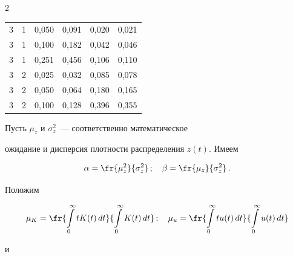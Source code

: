 \begin{multicols}{2}
\begin{table}
\begin{center}
\begin{tabular}{|c|c|c|c|c|c|}
3&1&0,050&0,091&0,020&0,021\\




3&1&0,100&0,182&0,042&0,046\\




3&1&0,251&0,456&0,106&0,110\\




3&2&0,025&0,032&0,085&0,078\\




3&2&0,050&0,064&0,180&0,165\\




3&2&0,100&0,128&0,396&0,355\\


\hline


\end{tabular}


\end{center}


\end{table}





Пусть $\mu_z$ и $\sigma_z^2$~--- соответственно математическое


ожидание и дисперсия плотности распределения $z(t)$. Имеем


$$


\alpha=\fr{\mu_z^2}{\sigma_z^2}\,;\quad


\beta=\fr{\mu_z}{\sigma_z^2}\,.


$$ 


Положим


\begin{equation} %


\mu_K=\fr{\int\limits_0^\infty tK(t)\,dt}{\int\limits_0^\infty K(t)\,dt}\,;\quad %




\mu_u=\fr{\int\limits_0^\infty tu(t)\,dt}{\int\limits_0^\infty


u(t)\,dt} %


\end{equation} %


и


\begin{align}



\end{align}
\end{multicols}
